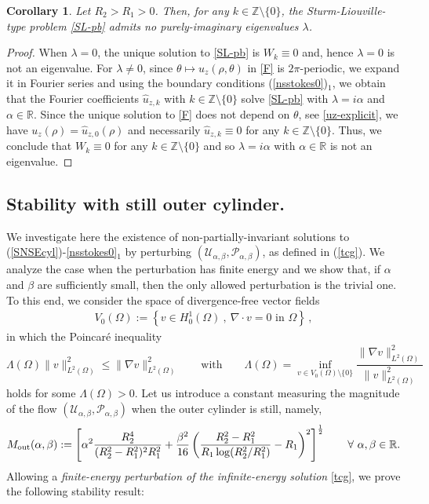 \documentclass[a4paper,11pt]{amsart}
\newtheorem{corollary}{Corollary}[section]
\numberwithin{equation}{section}
\numberwithin{figure}{section}
\newcommand{\R}{\mathbb{R}}
\def\U{{\mathcal U}}
\def\P{{\mathcal P}}
\def\eq#1{(\ref{#1})}
\begin{document}
	\begin{corollary}\label{coroll}
		Let $R_2>R_1>0$. Then, for any $k\in \mathbb{Z}\setminus \{0\}$, the Sturm-Liouville-type problem \eqref{SL-pb} admits no purely-imaginary eigenvalues $\lambda$.
	\end{corollary}
	\begin{proof}
		When $\lambda=0$, the unique solution to \eqref{SL-pb} is $W_k\equiv0$ and, hence $\lambda=0 $ is not an eigenvalue. For $\lambda\neq 0$, since $\theta \mapsto u_z(\rho, \theta)$ in \eqref{F} is $2\pi$-periodic, we expand it in Fourier series and using the boundary conditions \eq{nsstokes0}$_1$,
		we obtain that the Fourier coefficients $\widehat{u}_{z,k}$ with $k\in \mathbb{Z}\setminus\{0\}$ solve \eqref{SL-pb} with $\lambda=i\alpha$ and $\alpha\in\mathbb{R}$. Since the unique solution to \eqref{F} does not depend on $\theta$, see \eqref{uz-explicit}, we have $u_z(\rho)= \widehat{u}_{z, 0}(\rho)$ and necessarily $\widehat{u}_{z, k}\equiv 0$ for any $k\in \mathbb{Z}\setminus \{0\}$. Thus, we conclude that $W_k\equiv0$ for any $k\in \mathbb{Z}\setminus \{0\}$ and so $\lambda=i\alpha$ with $\alpha\in \mathbb{R}$ is not an eigenvalue.
	\end{proof}

\subsection{Stability with still outer cylinder.}\label{sec:unrestricteduniqueness}
	
We investigate here the existence of non-partially-invariant solutions to \eq{SNSEcyl}-\eqref{nsstokes0}$_1$ by perturbing $(\U_{\alpha, \beta}, \P_{\alpha, \beta})$, as defined in \eq{tcg}. We analyze the case when the perturbation has finite energy and we show that, if $\alpha$ and $\beta$ are sufficiently small, then the only allowed perturbation is the trivial one. To this end, we consider the space of divergence-free
vector fields
	$$
	\begin{array}{cc}
		V_0(\Omega):=\left\{v\in H^1_0(\Omega) \ , \ \nabla\cdot v= 0\text{ in }\Omega
		\right\}\, ,
	\end{array}
	$$ in which the Poincaré inequality
	\begin{equation}\label{poincare-const}
		\Lambda (\Omega)\| v\|^2_{L^2(\Omega)}\le\|\nabla v\|^2_{L^2(\Omega)}\qquad\mbox{with}\qquad
		\Lambda (\Omega)=\inf_{v\in V_0(\Omega)\setminus \{0\} }\frac{\|\nabla v\|^2_{L^2(\Omega)}}{\| v\|^2_{L^2(\Omega)}}
	\end{equation}
	holds for some $\Lambda(\Omega)>0$. Let us introduce a constant measuring the magnitude of the flow $(\U_{\alpha,\beta}, \P_{\alpha, \beta})$ when the outer cylinder is still, namely,
	\begin{equation}\label{M-alphabeta-new}
		M_{\rm out}(\alpha, \beta):= \left[\alpha^2 \frac{R_2^4}{(R_2^2 -R_1^2)^2R_1^2} + \frac{\beta^2}{16} \left(\frac{R_2^2-R_1^2}{R_1\log(R_2^2/R_1^2)}-R_1  \right)^2\right]^{\frac{1}{2}}\qquad\forall \ \alpha,\beta\in\R.
	\end{equation}
	Allowing a {\em finite-energy perturbation of the infinite-energy solution} \eqref{tcg}, we prove the following stability result:
	
\end{document}
